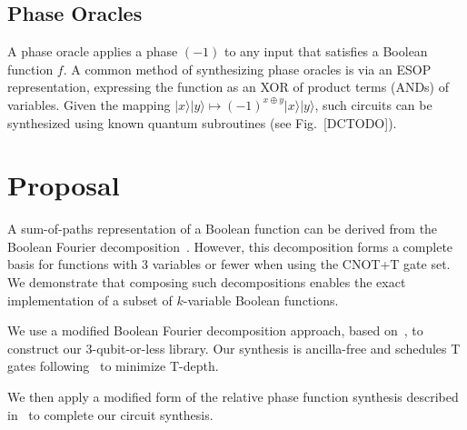 \documentclass[conference]{IEEEtran}
\begin{document}
\subsection{Phase Oracles}
A phase oracle applies a phase $(-1)$ to any input that satisfies a Boolean function $f$. A common method of synthesizing phase oracles is via an ESOP representation, expressing the function as an XOR of product terms (ANDs) of variables. Given the mapping $|x\rangle|y\rangle \mapsto (-1)^{x \oplus y}|x\rangle|y\rangle$, such circuits can be synthesized using known quantum subroutines (see Fig.~[DCTODO]).

\section{Proposal}

A sum-of-paths representation of a Boolean function can be derived from the Boolean Fourier decomposition~\cite{odonnell}. However, this decomposition forms a complete basis for functions with 3 variables or fewer when using the CNOT+T gate set. We demonstrate that composing such decompositions enables the exact implementation of a subset of $k$-variable Boolean functions.

We use a modified Boolean Fourier decomposition approach, based on~\cite{amy_duality}, to construct our 3-qubit-or-less library. Our synthesis is ancilla-free and schedules T gates following~\cite{amy2018} to minimize T-depth.

We then apply a modified form of the relative phase function synthesis described in~\cite{amy_relphase} to complete our circuit synthesis.




\end{document}
